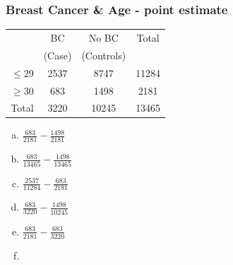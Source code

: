 \documentclass[slidestop,compress,mathserif,12pt,t,professionalfonts,xcolor=table]{beamer}
\newcommand{\solnMult}[1]{#1}
\begin{document}
\begin{frame}
\frametitle{Breast Cancer \& Age - point estimate}


{\small
\begin{center}
\begin{tabular}{r|c|c|c}
         & BC  & No BC & Total           \\
         & (Case)          & (Controls)       &                 \\
\hline
$\le 29$ & {2537} & {8747}  & {11284}\\
$\ge 30$ & {683}  & {1498}  & {2181} \\
\hline
Total    &{3220} &{10245} & {13465}\\
\end{tabular}
\end{center}
}

\begin{multicols}{2}
\begin{enumerate}[(a)]
\item $\frac{683}{2181} - \frac{1498}{2181}$
\item $\frac{683}{13465} - \frac{1498}{13465}$
\item $\frac{2537}{11284} - \frac{683}{2181}$
\item \solnMult{ $\frac{683}{3220} - \frac{1498}{10245}$} 
\item $\frac{683}{2181} - \frac{683}{3220}$
\item[]
\end{enumerate}
\end{multicols}

\end{frame}

\end{document}
